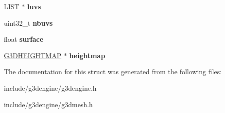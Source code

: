 \begin{DoxyCompactItemize}
L\+I\+ST $\ast$ {\bfseries luvs}
\item 
\mbox{\label{struct__G3DFACE_abfcdbe617655eeddb9016b574b46ecd0}} 
uint32\+\_\+t {\bfseries nbuvs}
\item 
\mbox{\label{struct__G3DFACE_a197df2478f728baf7ed251a71e6ad4b3}} 
float {\bfseries surface}
\item 
\mbox{\label{struct__G3DFACE_aaf7fad53545e4d4a558d5c2394a5549f}} 
\hyperlink{struct__G3DHEIGHTMAP}{G3\+D\+H\+E\+I\+G\+H\+T\+M\+AP} $\ast$ {\bfseries heightmap}
\end{DoxyCompactItemize}


The documentation for this struct was generated from the following files\+:\begin{DoxyCompactItemize}
\item 
include/g3dengine/g3dengine.\+h\item 
include/g3dengine/g3dmesh.\+h\end{DoxyCompactItemize}
